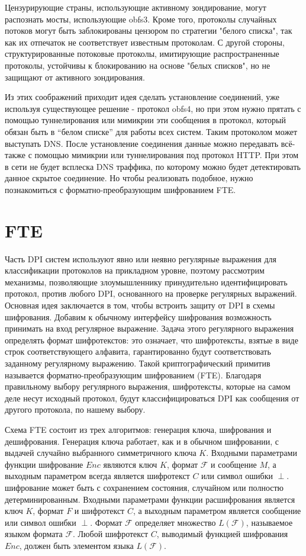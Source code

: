 Цензурирующие страны, использующие активному зондирование, могут распознать мосты, использующие obfs3.
Кроме того, протоколы случайных потоков могут быть заблокированы цензором по стратегии "белого списка",
так как их отпечаток не соответствует известным протоколам.
С другой стороны, структурированные потоковые протоколы, имитирующие распространенные протоколы,
устойчивы к блокированию на основе "белых списков", но не защищают от активного зондирования.

Из этих соображений приходит идея сделать установление соединений, уже используя существующее решение - протокол obfs4,
но при этом нужно прятать с помощью туннелирования или мимикрии эти сообщения в протокол,
который обязан быть в ``белом списке'' для работы всех систем. Таким протоколом может выступать DNS.
После установление соединения данные можно передавать всё-также с помощью мимикрии или туннелирования под протокол HTTP.
При этом в сети не будет всплеска DNS траффика, по которому можно будет детектировать данное скрытое соединение.
Но чтобы реализовать подобное, нужно познакомиться с форматно-преобразующим шифрованием FTE.

\section{FTE}

Часть DPI систем используют явно или неявно регулярные выражения для классификации протоколов на прикладном уровне,
поэтому рассмотрим механизмы, позволяющие злоумышленнику принудительно идентифицировать протокол, против любого DPI, основанного на проверке регулярных выражений.
Основная идея заключается в том, чтобы встроить защиту от DPI в схемы шифрования.
Добавим к обычному интерфейсу шифрования возможность принимать на вход регулярное выражение.
Задача этого регулярного выражения определять формат шифротекстов: это означает,
что шифротексты, взятые в виде строк соответствующего алфавита, гарантированно будут соответствовать заданному регулярному выражению.
Такой криптографический примитив называется форматно-преобразующим шифрованием (FTE).
Благодаря правильному выбору регулярного выражения, шифротексты, которые на самом деле несут исходный протокол,
будут классифицироваться DPI как сообщения от другого протокола, по нашему выбору.

Схема FTE состоит из трех алгоритмов: генерация ключа, шифрования и дешифрования.
Генерация ключа работает, как и в обычном шифровании, с выдачей случайно выбранного симметричного ключа $K$.
Входными параметрами функции шифрование $Enc$ являются ключ $K$, формат $\mathcal{F}$ и сообщение $M$,
а выходным параметром всегда является шифротекст $C$ или символ ошибки $\perp$.
шифрование может быть с сохранением состояния, случайном или полностю детерминированным.
Входными параметрами функции расшифрования является ключ $K$, формат $F$ и шифротекст $C$,
а выходным параметром является сообщение или символ ошибки $\perp$.
Формат $\mathcal{F}$ определяет множество $L(\mathcal{F})$, называемое языком формата $\mathcal{F}$.
Любой шифротекст $C$, выводимый функцией шифрования $Enc$, должен быть элементом языка $L(\mathcal{F})$.

